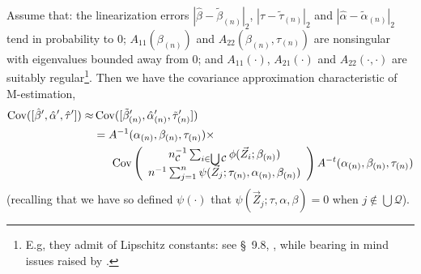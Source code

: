 \documentclass{article}
\begin{document}
Assume that: the linearization errors $|\hat\beta -\tilde{\beta}_{(n)}|_{2}$, 
$|\hat\tau -\tilde{\tau}_{(n)}|_{2}$ and $|\hat\alpha - \tilde{\alpha}_{(n)}|_{2}$ tend in probability to 0;
$A_{11}(\beta_{(n)})$ and $A_{22}(\beta_{(n)}, \tau_{(n)})$ are nonsingular
with eigenvalues bounded away from 0; and $A_{11}(\cdot)$, $A_{21}(\cdot)$ and $A_{22}(\cdot, \cdot)$ are suitably
regular\footnote{E.g, they admit of Lipschitz constants: see \S~9.8,
  , while bearing in mind issues raised
  by .}. 
Then we have the covariance approximation characteristic of M-estimation,
\begin{align*} \operatorname{Cov}([\hat\beta',\hat\alpha', \hat\tau']) \approx&
  \operatorname{Cov}([\tilde{\beta}_{(n)}',\hat{\alpha}_{(n)}',\tilde{\tau}_{(n)}'])\\
  &=
    A^{-1}(\alpha_{(n)}, \beta_{(n)}, \tau_{(n)}) \times \\
  &\hspace{1.5em} \operatorname{Cov}\left(
     \begin{array}{c}
       n_{\mathcal{C}}^{-1}\sum_{i\in \bigcup \mathcal{C}}\phi(\vec{Z}_{i}; \beta_{(n)} )\\
       n^{-1}\sum_{j=1}^{n}\psi(\vec{Z}_{j}; \tau_{(n)}, \alpha_{(n)}, \beta_{(n)} )
     \end{array}
    \right)
  A^{-t}(\alpha_{(n)}, \beta_{(n)}, \tau_{(n)})
\end{align*}
(recalling that we have so defined $\psi(\cdot)$ that $\psi(\vec{Z}_{j}; \tau, \alpha, \beta) = 0$ when
$j\not\in \bigcup \mathcal{Q}$).
\end{document}
